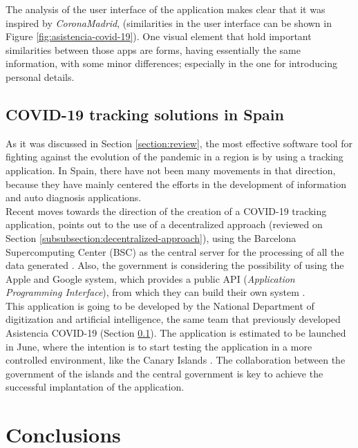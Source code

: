 \documentclass[a4paper, 12pt]{article}
\begin{document}
The analysis of the user interface of the application makes clear that it was inspired by \textit{CoronaMadrid}, (similarities in the user interface can be shown in Figure \ref{fig:asistencia-covid-19}). One visual element that hold important similarities between those apps are forms, having essentially the same information, with some minor differences; especially in the one for introducing personal details.

\subsection{COVID-19 tracking solutions in Spain}
\label{sec:information-apps-spain}

As it was discussed in Section \ref{section:review}, the most effective software tool for fighting against the evolution of the pandemic in a region is by using a tracking application. In Spain, there have not been many movements in that direction, because they have mainly centered the efforts in the development of information and auto diagnosis applications.\\

Recent moves towards the direction of the creation of a COVID-19 tracking application, points out to the use of a decentralized approach (reviewed on Section \ref{subsubsection:decentralized-approach}), using the Barcelona Supercomputing Center (BSC) as the central server for the processing of all the data generated \cite{covid19-tracking-bsc}. Also, the government is considering the possibility of using the Apple and Google system, which provides a public API (\textit{Application Programming Interface}), from which they can build their own system \cite{covid19-apple-google}.\\

This application is going to be developed by the National Department of digitization and artificial intelligence, the same team that previously developed Asistencia COVID-19 (Section \ref{sec:information-apps-spain}). The application is estimated to be launched in June, where the intention is to start testing the application in a more controlled environment, like the Canary Islands \cite{covid19-canary}. The collaboration between the government of the islands and the central government is key to achieve the successful implantation of the application. \\


\section{Conclusions}
\label{section:conclusions}
\end{document}
